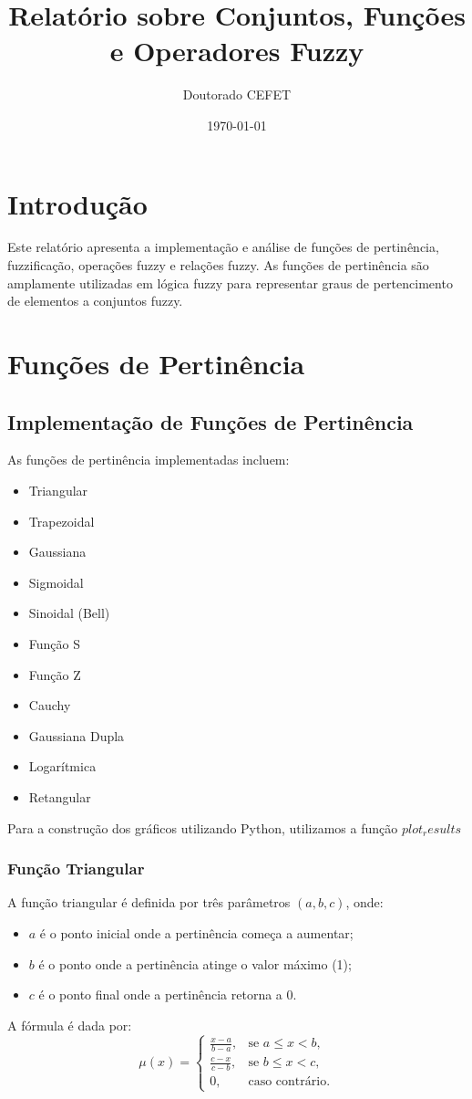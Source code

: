 \documentclass[a4paper,12pt]{article}
\title{Relatório sobre Conjuntos, Funções e Operadores Fuzzy}
\author{Doutorado CEFET}
\date{\today}
\begin{document}
\maketitle

\section{Introdução}
Este relatório apresenta a implementação e análise de funções de pertinência, fuzzificação, operações fuzzy e relações fuzzy. As funções de pertinência são amplamente utilizadas em lógica fuzzy para representar graus de pertencimento de elementos a conjuntos fuzzy.

\section{Funções de Pertinência}
\subsection{Implementação de Funções de Pertinência}

As funções de pertinência implementadas incluem:


\begin{itemize}
    \item Triangular
    \item Trapezoidal
    \item Gaussiana
    \item Sigmoidal
    \item Sinoidal (Bell)
    \item Função S
    \item Função Z
    \item Cauchy
    \item Gaussiana Dupla
    \item Logarítmica
    \item Retangular
\end{itemize}

Para a construção dos gráficos utilizando Python, utilizamos a função $plot_results$
    
\subsubsection{Função Triangular}
A função triangular é definida por três parâmetros $(a, b, c)$, onde:
\begin{itemize}
    \item $a$ é o ponto inicial onde a pertinência começa a aumentar;
    \item $b$ é o ponto onde a pertinência atinge o valor máximo (1);
    \item $c$ é o ponto final onde a pertinência retorna a 0.
\end{itemize}
A fórmula é dada por:
\[
\mu(x) =
\begin{cases}
\frac{x - a}{b - a}, & \text{se } a \leq x < b, \\
\frac{c - x}{c - b}, & \text{se } b \leq x < c, \\
0, & \text{caso contrário.}
\end{cases}
\]
\end{document}
